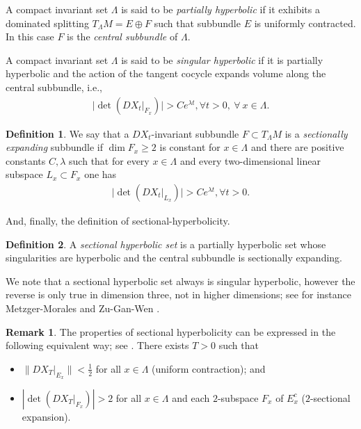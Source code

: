 \documentclass[12pt,reqno]{amsart}
\numberwithin{equation}{section}
\theoremstyle{plain}
\theoremstyle{definition}
\newtheorem{remark}[theorem]{Remark}
\newtheorem{definition}{Definition}
\newcommand{\la}{\lambda}
\begin{document}
A compact invariant set $\Lambda$ is said to be
\emph{partially hyperbolic} if it exhibits a dominated
splitting $T_{\Lambda}M = E \oplus F$ such that subbundle
$E$ is uniformly contracted. In this case $F$ is the
\emph{central subbundle} of $\Lambda$.

A compact invariant set $\Lambda$ is said to be
\emph{singular hyperbolic} if it is partially hyperbolic and
the action of the tangent cocycle expands volume along the
central subbundle, i.e.,
\begin{align}\label{eq:def-vol-exp}
      \vert \det (DX_t\vert_{F_x}) \vert > C e^{\la t},
      \forall t>0, \ \forall \ x \in \Lambda.
    \end{align}

\begin{definition}\label{def:sec-exp}
  We say that a $DX_t$-invariant subbundle $F \subset
  T_{\Lambda}M$ is a \emph{sectionally expanding} subbundle
  if $\dim F_x \geq 2$ is constant for $x\in\Lambda$
  and there are positive constants $C , \lambda$ such that for every $x
    \in \Lambda$ and every two-dimensional linear subspace
    $L_x \subset F_x$ one has
    \begin{align}\label{eq:def-sec-exp}
      \vert \det (DX_t \vert_{L_x})\vert > C e^{\la t},
      \forall t>0.
    \end{align}
  \end{definition}

And, finally, the definition of sectional-hyperbolicity.

\begin{definition}\label{sechypset} \cite[Definition
  2.7]{MeMor06} A \emph{sectional hyperbolic set} is a
  partially hyperbolic set whose singularities are
  hyperbolic and the central subbundle is sectionally
  expanding.
\end{definition}

We note that a sectional hyperbolic set always is
singular hyperbolic, however the reverse is only true
in dimension three, not in higher dimensions; see for
instance Metzger-Morales \cite{MeMor06} and Zu-Gan-Wen
\cite{ZGW08}.

\begin{remark}
  \label{rmk:sec-exp-discrete}
  The properties of sectional hyperbolicity can be expressed in the following
  equivalent way; see \cite{AraPac2010}.  There exists
  $T>0$ such that
  \begin{itemize}
  \item $\|DX_T\vert_{E_x}\|<\frac12$ for all $x\in\Lambda$
    (uniform contraction); and
  \item $|\det (DX_T\vert_{ F_x})|> 2$ for all $x\in\Lambda$
    and each $2$-subspace $F_x$ of $E^c_x$ ($2$-sectional expansion).
  \end{itemize}
\end{remark}
\end{document}
